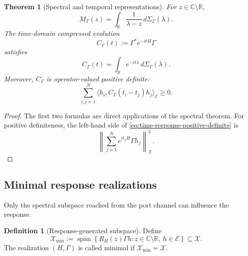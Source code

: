 \documentclass[11pt,reqno]{scrartcl}
\newcommand{\CC}{\mathbb C}
\newcommand{\RR}{\mathbb R}
\newcommand{\inner}[2]{\langle #1,#2\rangle}
\newcommand{\scrX}{\mathscr X}
\newcommand{\scrE}{\mathscr E}
\newcommand{\Mresp}{M_{\Gamma}}
\newcommand{\Hmin}{\mathscr X_{\min}}
\theoremstyle{plain}
\newtheorem{theorem}{Theorem}[section]
\theoremstyle{definition}
\newtheorem{definition}[definition]{Definition}
\theoremstyle{remark}
\begin{document}
\begin{theorem}[Spectral and temporal representations]
\label{thm:spectral-temporal-response}
For \(z\in\CC\setminus\RR\),
\begin{equation}
  \boxed{
  \Mresp(z)=\int_{\RR}\frac{1}{\lambda-z}\,
  d\Sigma_\Gamma(\lambda).}
  \label{eq:response-spectral-representation}
\end{equation}
The time-domain compressed evolution
\begin{equation}
  C_\Gamma(t):=\Gamma^*e^{-itH}\Gamma
  \label{eq:time-response}
\end{equation}
satisfies
\begin{equation}
  \boxed{
  C_\Gamma(t)=\int_{\RR}e^{-it\lambda}\,
  d\Sigma_\Gamma(\lambda).}
  \label{eq:time-response-spectral}
\end{equation}
Moreover, \(C_\Gamma\) is operator-valued positive definite:
\begin{equation}
  \sum_{i,j=1}^{N}
  \inner{h_i}{C_\Gamma(t_i-t_j)h_j}_{\scrE}\geq0.
  \label{eq:time-response-positive-definite}
\end{equation}
\end{theorem}

\begin{proof}
The first two formulas are direct applications of the spectral theorem.
For positive definiteness, the left-hand side of
\eqref{eq:time-response-positive-definite} is
\begin{equation}
  \left\|
  \sum_{j=1}^{N}e^{it_jH}\Gamma h_j
  \right\|_{\scrX}^{2}.
\end{equation}
\end{proof}

\subsection{Minimal response realizations}

Only the spectral subspace reached from the port channel can influence the
response.

\begin{definition}[Response-generated subspace]
\label{def:response-generated-subspace}
Define
\begin{equation}
  \Hmin
  :=\overline{\operatorname{span}}
  \left\{
    R_H(z)\Gamma h:
    z\in\CC\setminus\RR,\ h\in\scrE
  \right\}
  \subseteq\scrX.
  \label{eq:minimal-subspace}
\end{equation}
The realization \((H,\Gamma)\) is called minimal if
\(\Hmin=\scrX\).
\end{definition}
\end{document}
